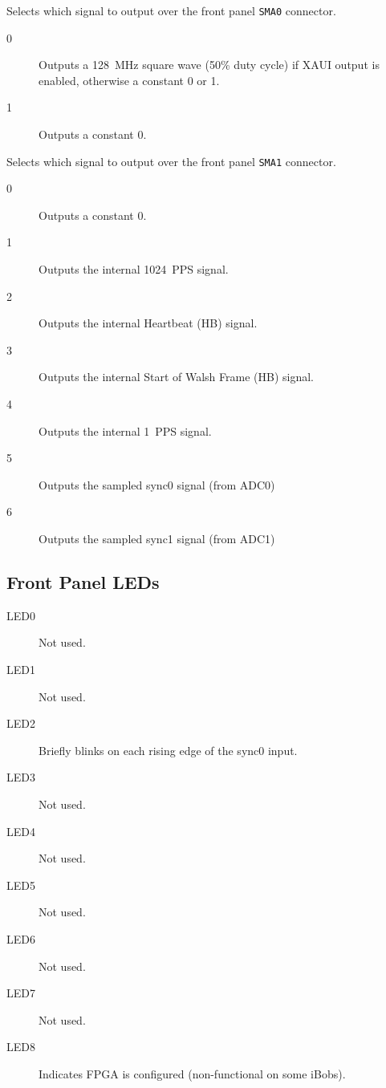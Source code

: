 \documentclass[12pt]{article}
\begin{document}
\begin{description}

 Selects which signal to output over the front panel \verb|SMA0|
connector.

\begin{description}

\item[0] Outputs a 128~MHz square wave (50\% duty cycle) if XAUI output is
enabled, otherwise a constant 0 or 1.

\item[1] Outputs a constant 0.

\end{description}

 Selects which signal to output over the front panel \verb|SMA1|
connector.

\begin{description}

\item[0] Outputs a constant 0.

\item[1] Outputs the internal 1024~PPS signal.

\item[2] Outputs the internal Heartbeat (HB) signal.

\item[3] Outputs the internal Start of Walsh Frame (HB) signal.

\item[4] Outputs the internal 1~PPS signal.

\item[5] Outputs the sampled sync0 signal (from ADC0)

\item[6] Outputs the sampled sync1 signal (from ADC1)

\end{description}

\end{description}

%

\filbreak
  \subsection{Front Panel LEDs}
\begin{description}
\item[LED0] Not used.
\item[LED1] Not used.
\item[LED2] Briefly blinks on each rising edge of the sync0 input.
\item[LED3] Not used.
\item[LED4] Not used.
\item[LED5] Not used.
\item[LED6] Not used.
\item[LED7] Not used.
\item[LED8] Indicates FPGA is configured (non-functional on some iBobs).
\end{description}
\end{document}
